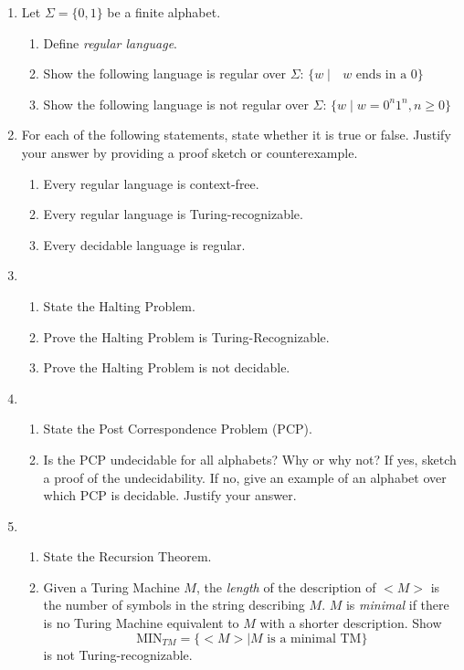 \documentclass[11pt]{article}
\begin{document}
\begin{enumerate}

\item Let $\Sigma = \{0,1\}$ be a finite alphabet.
	\begin{enumerate}
	\itemsep = 0pt
		\item Define {\em regular language}.
		\item Show the following language is regular over $\Sigma$:
		$
			\{ w \mid \mbox{ $w$ ends in a $0$} \}
		$
		\item Show the following language is not regular over $\Sigma$:
		$
			\{ w \mid w = 0^n1^n, n \geq 0 \}
		$
	\end{enumerate}

\item For each of the following statements, state whether it is true or false.
	Justify your answer by providing a proof sketch or counterexample.
	\begin{enumerate}
	\itemsep= 0pt
		\item Every regular language is context-free.
		\item Every regular language is Turing-recognizable.
		\item Every decidable language is regular.
	\end{enumerate}

\item 
	\begin{enumerate}
	\itemsep= 0pt
		\item State the Halting Problem.
		\item Prove the Halting Problem is Turing-Recognizable.
		\item Prove the Halting Problem is not decidable.
	\end{enumerate}

\item 
	\begin{enumerate}
		\itemsep=0pt
		\item State the Post Correspondence Problem (PCP).
		\item Is the PCP undecidable for all alphabets?
			Why or why not?  If yes, sketch a proof of the undecidability.  If no, 
			give an example of an alphabet over which PCP is decidable.  Justify
			your answer.
	\end{enumerate}

\item 
	\begin{enumerate}
		\itemsep=0pt
		\item State the Recursion Theorem.
		\item Given a Turing Machine $M$, the {\em length} of the description of
			$<\!\!\!M\!\!\!>$ is the number of symbols in the string describing $M$.  $M$
			is {\em minimal} if there is no Turing Machine equivalent to $M$ with
			a shorter description.  Show
			$$
				\mbox{MIN}_{TM} = \{<\!\!\!M\!\!\!> \mid \mbox{$M$ is a minimal TM} \}
			$$ 
			is not Turing-recognizable.
	\end{enumerate}


\end{enumerate}
\end{document}

